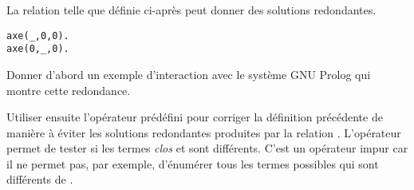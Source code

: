 \begin{Exercise}
  \label{ex:prolog_redondance}
La relation  telle que définie ci-après peut donner des
solutions redondantes.
\begin{verbatim}
axe(_,0,0).
axe(0,_,0).
\end{verbatim}
Donner d'abord un exemple d'interaction avec le système GNU Prolog qui
montre cette redondance.

Utiliser ensuite l'opérateur prédéfini  pour
corriger la définition précédente de manière à éviter les solutions
redondantes produites par la relation .
L'opérateur  permet de tester si les termes
\emph{clos} \codeinline et  sont différents.  C'est un opérateur
impur car il ne permet pas, par exemple, d'énumérer tous les termes
 possibles qui sont différents de .
\end{Exercise}

\begin{Answer}[ref={ex:prolog_redondance}]
\end{Answer}